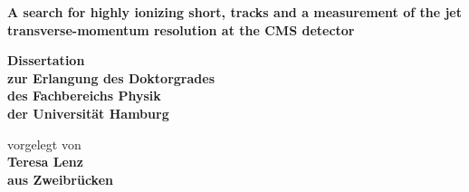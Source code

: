 \begin{titlepage}
   \begin{center}
     \thispagestyle{empty}
     \vspace*{1cm}
     \linespread{1.5}
       {\huge\bfseries A search for highly ionizing short, tracks and a measurement of the jet transverse-momentum resolution at the CMS detector\par}
       \begin{Large} 
         \textbf{Dissertation\\
           zur Erlangung des Doktorgrades\\
           des Fachbereichs Physik\\
           der Universit\"{a}t Hamburg\\}
       \end{Large}
       \vskip2cm
       \begin{large}
         vorgelegt von\\
         {\bf Teresa Lenz\\
         aus Zweibr\"{u}cken}
         \vfill
       \end{large}
   \end{center}
 \end{titlepage}
 
 
 \newpage 
 \thispagestyle{empty}
 \quad 
 \newpage
 \thispagestyle{empty}
 
